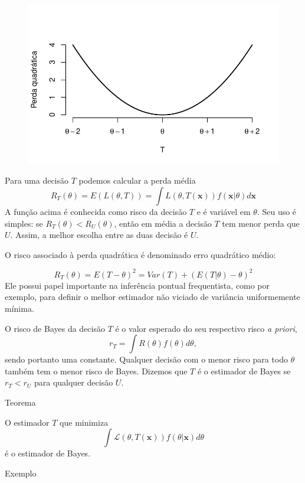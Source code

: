 \documentclass[
  letterpaper,
  DIV=11,
  numbers=noendperiod]{scrreprt}
\theoremstyle{definition}
\theoremstyle{definition}
\theoremstyle{remark}
\begin{document}
\begin{figure}[H]

{\centering \includegraphics{estimacao_files/figure-pdf/unnamed-chunk-1-1.pdf}

}

\end{figure}

Para uma decisão \(T\) podemos calcular a perda média
\[R_T(\theta)=E(L(\theta,T))=\int L(\theta,T(\mathbf{x}))f(\mathbf{x}|\theta)d\mathbf{x}\]
A função acima é conhecida como risco da decisão \(T\) e é variável em
\(\theta\). Seu uso é simples: se \(R_T(\theta)<R_U(\theta)\), então em
média a decisão \(T\) tem menor perda que \(U\). Assim, a melhor escolha
entre as duas decisão é \(U\).

O risco associado à perda quadrática é denominado erro quadrático médio:

\[R_T(\theta)=E(T-\theta)^2= Var(T)+(E(T|\theta)-\theta)^2\] Ele possui
papel importante na inferência pontual frequentista, como por exemplo,
para definir o melhor estimador não viciado de variância uniformemente
mínima.

O risco de Bayes da decisão \(T\) é o valor esperado do seu respectivo
risco \textit{a priori}, \[r_T=\int R(\theta)f(\theta)d\theta,\] sendo
portanto uma constante. Qualquer decisão com o menor risco para todo
\(\theta\) também tem o menor risco de Bayes. Dizemos que \(T\) é o
estimador de Bayes se \(r_T<r_U\) para qualquer decisão \(U\).

Teorema

O estimador \(T\) que minimiza
\[\int \mathcal{L}(\theta,T(\mathbf{x}))f(\theta|\mathbf{x})d\theta\] é
o estimador de Bayes.

Exemplo
\end{document}
